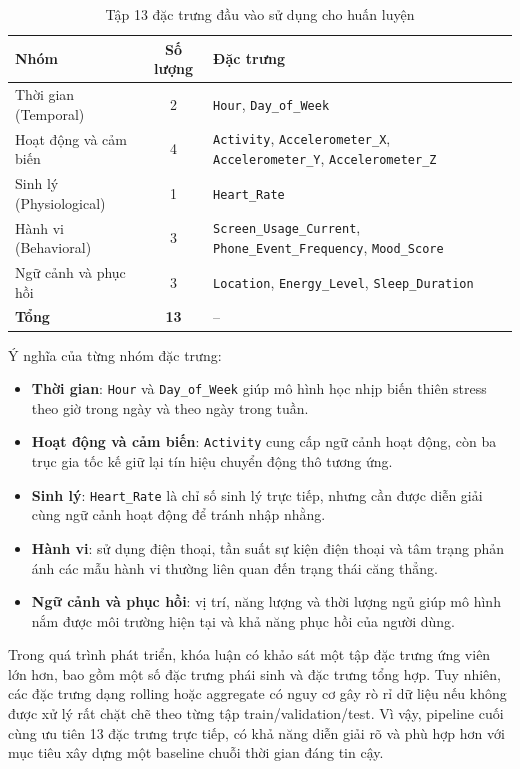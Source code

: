 \begin{table}[H]
\centering
\caption{Tập 13 đặc trưng đầu vào sử dụng cho huấn luyện}
\label{tab:13_features_final}
\small
\begin{tabular}{|l|c|p{8.5cm}|}
\hline
\textbf{Nhóm} & \textbf{Số lượng} & \textbf{Đặc trưng} \\
\hline
Thời gian (Temporal) & 2 & \texttt{Hour}, \texttt{Day\_of\_Week} \\
\hline
Hoạt động và cảm biến & 4 & \texttt{Activity}, \texttt{Accelerometer\_X}, \texttt{Accelerometer\_Y}, \texttt{Accelerometer\_Z} \\
\hline
Sinh lý (Physiological) & 1 & \texttt{Heart\_Rate} \\
\hline
Hành vi (Behavioral) & 3 & \texttt{Screen\_Usage\_Current}, \texttt{Phone\_Event\_Frequency}, \texttt{Mood\_Score} \\
\hline
Ngữ cảnh và phục hồi & 3 & \texttt{Location}, \texttt{Energy\_Level}, \texttt{Sleep\_Duration} \\
\hline
\textbf{Tổng} & \textbf{13} & -- \\
\hline
\end{tabular}
\end{table}

Ý nghĩa của từng nhóm đặc trưng:
\begin{itemize}
    \item \textbf{Thời gian}: \texttt{Hour} và \texttt{Day\_of\_Week} giúp mô hình học nhịp biến thiên stress theo giờ trong ngày và theo ngày trong tuần.
    \item \textbf{Hoạt động và cảm biến}: \texttt{Activity} cung cấp ngữ cảnh hoạt động, còn ba trục gia tốc kế giữ lại tín hiệu chuyển động thô tương ứng.
    \item \textbf{Sinh lý}: \texttt{Heart\_Rate} là chỉ số sinh lý trực tiếp, nhưng cần được diễn giải cùng ngữ cảnh hoạt động để tránh nhập nhằng.
    \item \textbf{Hành vi}: sử dụng điện thoại, tần suất sự kiện điện thoại và tâm trạng phản ánh các mẫu hành vi thường liên quan đến trạng thái căng thẳng.
    \item \textbf{Ngữ cảnh và phục hồi}: vị trí, năng lượng và thời lượng ngủ giúp mô hình nắm được môi trường hiện tại và khả năng phục hồi của người dùng.
\end{itemize}

Trong quá trình phát triển, khóa luận có khảo sát một tập đặc trưng ứng viên lớn hơn, bao gồm một số đặc trưng phái sinh và đặc trưng tổng hợp. Tuy nhiên, các đặc trưng dạng rolling hoặc aggregate có nguy cơ gây rò rỉ dữ liệu nếu không được xử lý rất chặt chẽ theo từng tập train/validation/test. Vì vậy, pipeline cuối cùng ưu tiên 13 đặc trưng trực tiếp, có khả năng diễn giải rõ và phù hợp hơn với mục tiêu xây dựng một baseline chuỗi thời gian đáng tin cậy.

